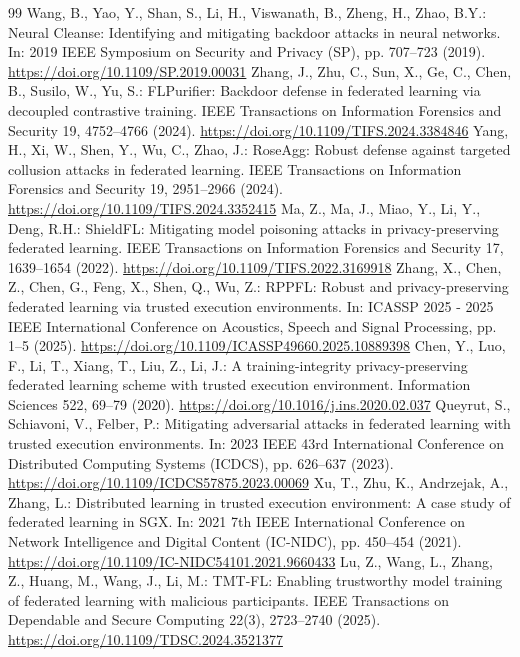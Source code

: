 \documentclass[runningheads,orivec]{llncs}
\begin{document}
\begin{thebibliography}{99}
     Wang, B., Yao, Y., Shan, S., Li, H., Viswanath, B., Zheng, H., Zhao, B.Y.: Neural Cleanse: Identifying and mitigating backdoor attacks in neural networks. In: 2019 IEEE Symposium on Security and Privacy (SP), pp. 707--723 (2019). \url{https://doi.org/10.1109/SP.2019.00031}
     Zhang, J., Zhu, C., Sun, X., Ge, C., Chen, B., Susilo, W., Yu, S.: FLPurifier: Backdoor defense in federated learning via decoupled contrastive training. IEEE Transactions on Information Forensics and Security 19, 4752--4766 (2024). \url{https://doi.org/10.1109/TIFS.2024.3384846}
     Yang, H., Xi, W., Shen, Y., Wu, C., Zhao, J.: RoseAgg: Robust defense against targeted collusion attacks in federated learning. IEEE Transactions on Information Forensics and Security 19, 2951--2966 (2024). \url{https://doi.org/10.1109/TIFS.2024.3352415}
     Ma, Z., Ma, J., Miao, Y., Li, Y., Deng, R.H.: ShieldFL: Mitigating model poisoning attacks in privacy-preserving federated learning. IEEE Transactions on Information Forensics and Security 17, 1639--1654 (2022). \url{https://doi.org/10.1109/TIFS.2022.3169918}
     Zhang, X., Chen, Z., Chen, G., Feng, X., Shen, Q., Wu, Z.: RPPFL: Robust and privacy-preserving federated learning via trusted execution environments. In: ICASSP 2025 - 2025 IEEE International Conference on Acoustics, Speech and Signal Processing, pp. 1--5 (2025). \url{https://doi.org/10.1109/ICASSP49660.2025.10889398}
     Chen, Y., Luo, F., Li, T., Xiang, T., Liu, Z., Li, J.: A training-integrity privacy-preserving federated learning scheme with trusted execution environment. Information Sciences 522, 69--79 (2020). \url{https://doi.org/10.1016/j.ins.2020.02.037}
     Queyrut, S., Schiavoni, V., Felber, P.: Mitigating adversarial attacks in federated learning with trusted execution environments. In: 2023 IEEE 43rd International Conference on Distributed Computing Systems (ICDCS), pp. 626--637 (2023). \url{https://doi.org/10.1109/ICDCS57875.2023.00069}
     Xu, T., Zhu, K., Andrzejak, A., Zhang, L.: Distributed learning in trusted execution environment: A case study of federated learning in SGX. In: 2021 7th IEEE International Conference on Network Intelligence and Digital Content (IC-NIDC), pp. 450--454 (2021). \url{https://doi.org/10.1109/IC-NIDC54101.2021.9660433}
     Lu, Z., Wang, L., Zhang, Z., Huang, M., Wang, J., Li, M.: TMT-FL: Enabling trustworthy model training of federated learning with malicious participants. IEEE Transactions on Dependable and Secure Computing 22(3), 2723--2740 (2025). \url{https://doi.org/10.1109/TDSC.2024.3521377}

\end{thebibliography}
\end{document}
